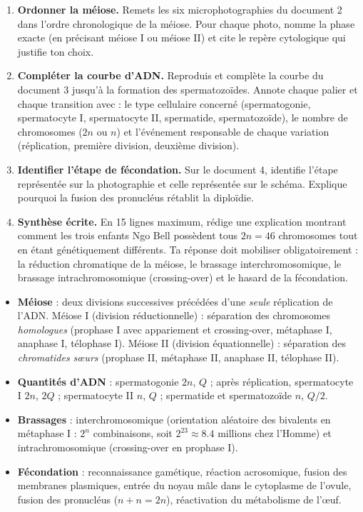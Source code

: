 \documentclass[11pt]{article}
\newcounter{popsec}
\newcounter{popsub}
\newcommand{\courssub}[1]{%
  \stepcounter{popsub}%
  \par\vspace{9pt}\noindent{\popxbold\fontsize{11.5}{13}\selectfont\color{popink}{\color{poporange}\thepopsec.\thepopsub}\hspace{6pt}#1}\par\nopagebreak\vspace{4pt}
}
\begin{document}
\begin{enumerate}
\item \textbf{Ordonner la méiose.} Remets les six microphotographies du document 2 dans l'ordre chronologique de la méiose. Pour chaque photo, nomme la phase exacte (en précisant méiose I ou méiose II) et cite le repère cytologique qui justifie ton choix.
\item \textbf{Compléter la courbe d'ADN.} Reproduis et complète la courbe du document 3 jusqu'à la formation des spermatozoïdes. Annote chaque palier et chaque transition avec : le type cellulaire concerné (spermatogonie, spermatocyte I, spermatocyte II, spermatide, spermatozoïde), le nombre de chromosomes ($2n$ ou $n$) et l'événement responsable de chaque variation (réplication, première division, deuxième division).
\item \textbf{Identifier l'étape de fécondation.} Sur le document 4, identifie l'étape représentée sur la photographie et celle représentée sur le schéma. Explique pourquoi la fusion des pronucléus rétablit la diploïdie.
\item \textbf{Synthèse écrite.} En 15 lignes maximum, rédige une explication montrant comment les trois enfants Ngo Bell possèdent tous $2n = 46$ chromosomes tout en étant génétiquement différents. Ta réponse doit mobiliser obligatoirement : la réduction chromatique de la méiose, le brassage interchromosomique, le brassage intrachromosomique (crossing-over) et le hasard de la fécondation.
\end{enumerate}

\courssub{Ressources à mobiliser}

\begin{aretenir}
\begin{itemize}
\item \textbf{Méiose} : deux divisions successives précédées d'une \emph{seule} réplication de l'ADN. Méiose I (division réductionnelle) : séparation des chromosomes \emph{homologues} (prophase I avec appariement et crossing-over, métaphase I, anaphase I, télophase I). Méiose II (division équationnelle) : séparation des \emph{chromatides sœurs} (prophase II, métaphase II, anaphase II, télophase II).
\item \textbf{Quantités d'ADN} : spermatogonie $2n$, $Q$ ; après réplication, spermatocyte I $2n$, $2Q$ ; spermatocyte II $n$, $Q$ ; spermatide et spermatozoïde $n$, $Q/2$.
\item \textbf{Brassages} : interchromosomique (orientation aléatoire des bivalents en métaphase I : $2^n$ combinaisons, soit $2^{23} \approx \num{8,4}$ millions chez l'Homme) et intrachromosomique (crossing-over en prophase I).
\item \textbf{Fécondation} : reconnaissance gamétique, réaction acrosomique, fusion des membranes plasmiques, entrée du noyau mâle dans le cytoplasme de l'ovule, fusion des pronucléus ($n + n = 2n$), réactivation du métabolisme de l'œuf.
\end{itemize}
\end{aretenir}
\end{document}
